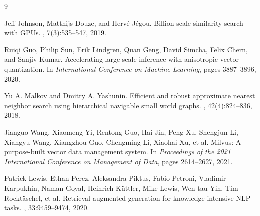 \documentclass[sigconf, nonacm]{acmart}
\begin{document}
\begin{thebibliography}{9}

Jeff Johnson, Matthijs Douze, and Hervé Jégou.
\newblock Billion-scale similarity search with GPUs.
, 7(3):535--547, 2019.

Ruiqi Guo, Philip Sun, Erik Lindgren, Quan Geng, David Simcha, Felix Chern, and Sanjiv Kumar.
\newblock Accelerating large-scale inference with anisotropic vector quantization.
\newblock In {\em International Conference on Machine Learning}, pages 3887--3896, 2020.

Yu A. Malkov and Dmitry A. Yashunin.
\newblock Efficient and robust approximate nearest neighbor search using hierarchical navigable small world graphs.
, 42(4):824--836, 2018.

Jianguo Wang, Xiaomeng Yi, Rentong Guo, Hai Jin, Peng Xu, Shengjun Li, Xiangyu Wang, Xiangzhou Guo, Chengming Li, Xiaohai Xu, et al.
\newblock Milvus: A purpose-built vector data management system.
\newblock In {\em Proceedings of the 2021 International Conference on Management of Data}, pages 2614--2627, 2021.

Patrick Lewis, Ethan Perez, Aleksandra Piktus, Fabio Petroni, Vladimir Karpukhin, Naman Goyal, Heinrich Küttler, Mike Lewis, Wen-tau Yih, Tim Rocktäschel, et al.
\newblock Retrieval-augmented generation for knowledge-intensive NLP tasks.
, 33:9459--9474, 2020.

\end{thebibliography}
\end{document}
